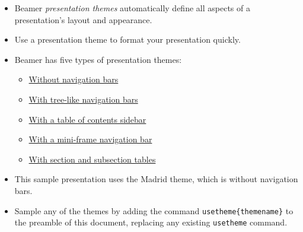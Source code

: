 \documentclass[notes=show,beamer]{beamer}
\newenvironment{stepitemize}{\begin{itemize}[<+->]}{\end{itemize} }
\begin{document}
\begin{frame}%


\begin{stepitemize}
\item Beamer \textit{presentation themes} automatically define all aspects
of a presentation's layout and appearance.

\item Use a presentation theme to format your presentation quickly.

\item Beamer has five types of presentation themes:

\begin{itemize}
\item 
\hyperref{}{}{nav}{Without navigation bars}%

\item 
\hyperref{}{}{tree}{With tree-like navigation bars}%

\item 
\hyperref{}{}{toc}{With a table of contents sidebar}%

\item 
\hyperref{}{}{mini}{With a mini-frame navigation bar}%

\item \hyperlink{sec}{With section and subsection tables}
\end{itemize}

\item This sample presentation uses the Madrid theme, which is without
navigation bars.

\item Sample any of the themes by adding the command \texttt{\TEXTsymbol{%
\backslash}usetheme\{themename\}} to the preamble of this document,
replacing any existing \texttt{\TEXTsymbol{\backslash}usetheme} command.
\end{stepitemize}

\transboxout%
\end{frame}%
\end{document}
